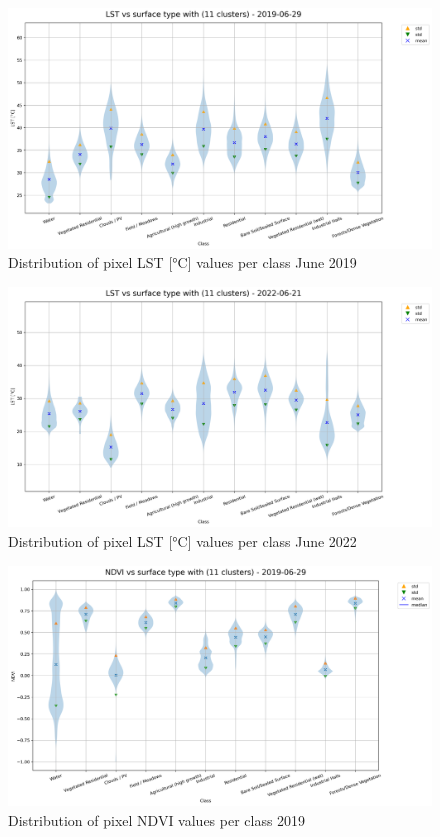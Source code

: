 \documentclass[12pt,a4paper, english,twoside]{scrartcl}
\begin{document}
       \begin{landscape}
         \begin{figure}[!p]
           \centering
           \includegraphics[width=0.91\linewidth]{img/LST vs surface type with (11 clusters) - 2019-06-29.png}
           \caption{Distribution of pixel \gls{LST} [°C] values per class June 2019 \label{fig:lstclusters}}
         \end{figure}

         \begin{figure}[!p]
           \centering
           \includegraphics[width=0.91\linewidth]{img/LST vs surface type with (11 clusters) - 2022-06-21.png}
           \caption{Distribution of pixel \gls{LST} [°C] values per class June 2022 \label{fig:lstclusters22}}
         \end{figure}

         \begin{figure}[!p]
           \centering
           \includegraphics[width=0.91\linewidth]{img/NDVI vs surface type with (11 clusters) - 2019-06-29.png}
           \caption{Distribution of pixel \gls{NDVI} values per class 2019\label{fig:ndviclusters2019}}
         \end{figure}


\end{landscape}
\end{document}
